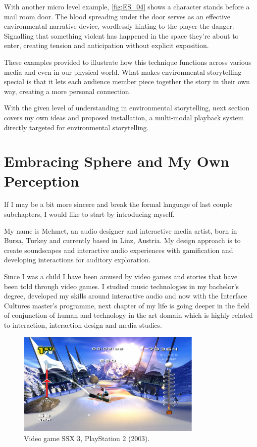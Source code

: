     With another micro level example, \ref{fig:ES_04} shows a character stands before a mail room door. The blood spreading under the door serves as an effective environmental narrative device, wordlessly hinting to the player the danger. Signalling that something violent has happened in the space they're about to enter, creating tension and anticipation without explicit exposition.\par    

    These examples provided to illustrate how this technique functions across various media and even in our physical world. What makes environmental storytelling special is that it lets each audience member piece together the story in their own way, creating a more personal connection.\par

    With the given level of understanding in environmental storytelling, next section covers my own ideas and proposed installation, a multi-modal playback system directly targeted for environmental storytelling.\par
    \section{Embracing Sphere and My Own Perception} 
    If I may be a bit more sincere and break the formal language of last couple subchapters, I would like to start by introducing myself.\par 
    
    My name is Mehmet, an audio designer and interactive media artist, born in Bursa, Turkey and currently based in Linz, Austria. My design approach is to create soundscapes and interactive audio experiences with gamification and developing interactions for auditory exploration.\par

    Since I was a child I have been amused by video games and stories that have been told through video games. I studied music technologies in my bachelor's degree, developed my skills around interactive audio and now with the Interface Cultures master's programme, next chapter of my life is going deeper in the field of conjunction of human and technology in the art domain which is highly related to interaction, interaction design and media studies.\par

    \begin{figure}[H]
    \centering
    \includegraphics[width=0.8\textwidth]{images/ssx3}
    \caption{Video game SSX 3, PlayStation 2 (2003).}
    \label{fig:SSX3}
    \end{figure}

